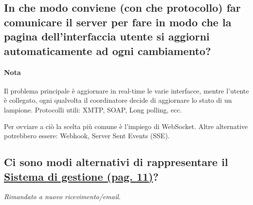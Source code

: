 \subsection*{In che modo conviene (con che protocollo) far comunicare il server per fare in modo che la pagina dell'interfaccia utente si aggiorni automaticamente ad ogni cambiamento?}

\paragraph{Nota} Il problema principale è aggiornare in real-time le varie interfacce, mentre l'utente è collegato, ogni qualvolta il coordinatore decide di aggiornare lo stato di un lampione. Protocolli utili: XMTP, SOAP, Long polling, ecc.

Per ovviare a ciò la scelta più comune è l'impiego di WebSocket. Altre alternative potrebbero essere: Webhook, Server Sent Events (SSE).

\subsection*{Ci sono modi alternativi di rappresentare il \href{https://github.com/SWEasabi/analisi-dei-requisiti/blob/69fd3970d6618d506a725d9a7cd83afa3417eed1/src-doc/contenuti/img/casi_uso_grafici-applicazione\%2Cgestione.png}{Sistema di gestione (pag. 11)}?}

\emph{Rimandato a nuovo ricevimento/email.}